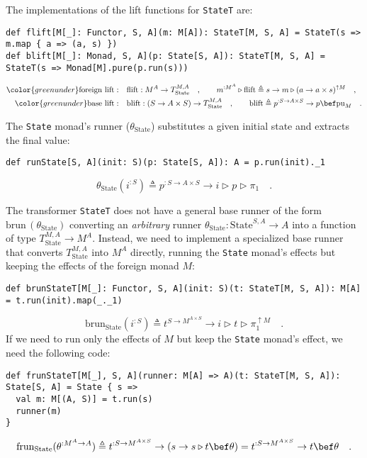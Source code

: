 The implementations of the lift functions for \lstinline!StateT!
are:
\begin{lstlisting}
def flift[M[_]: Functor, S, A](m: M[A]): StateT[M, S, A] = StateT(s => m.map { a => (a, s) })
def blift[M[_]: Monad, S, A](p: State[S, A]): StateT[M, S, A] = StateT(s => Monad[M].pure(p.run(s)))
\end{lstlisting}
\begin{align*}
{\color{greenunder}\text{foreign lift}:}\quad & \text{flift}:M^{A}\rightarrow T_{\text{State}}^{M,A}\quad,\quad\quad m^{:M^{A}}\triangleright\text{flift}\triangleq s\rightarrow m\triangleright(a\rightarrow a\times s)^{\uparrow M}\quad,\\
{\color{greenunder}\text{base lift}:}\quad & \text{blift}:(S\rightarrow A\times S)\rightarrow T_{\text{State}}^{M,A}\quad,\quad\quad\text{blift}\triangleq p^{:S\rightarrow A\times S}\rightarrow p\bef\text{pu}_{M}\quad.
\end{align*}

The \lstinline!State! monad\textsf{'}s runner ($\theta_{\text{State}}$) substitutes
a given initial state and extracts the final value:
\begin{lstlisting}
def runState[S, A](init: S)(p: State[S, A]): A = p.run(init)._1
\end{lstlisting}
\[
\theta_{\text{State}}(i^{:S})\triangleq p^{:S\rightarrow A\times S}\rightarrow i\triangleright p\triangleright\pi_{1}\quad.
\]

The transformer \lstinline!StateT! does not have a general base runner
of the form $\text{brun}\,(\theta_{\text{State}})$ converting an
\emph{arbitrary} runner $\theta_{\text{State}}:\text{State}^{S,A}\rightarrow A$
into a function of type $T_{\text{State}}^{M,A}\rightarrow M^{A}$.
Instead, we need to implement a specialized base runner that converts
$T_{\text{State}}^{M,A}$ into $M^{A}$ directly, running the \lstinline!State!
monad\textsf{'}s effects but keeping the effects of the foreign monad $M$:
\begin{lstlisting}
def brunStateT[M[_]: Functor, S, A](init: S)(t: StateT[M, S, A]): M[A] = t.run(init).map(_._1)
\end{lstlisting}
\[
\text{brun}_{\text{State}}(i^{:S})\triangleq t^{S\rightarrow M^{A\times S}}\rightarrow i\triangleright t\triangleright\pi_{1}^{\uparrow M}\quad.
\]
If we need to run only the effects of $M$ but keep the \lstinline!State!
monad\textsf{'}s effect, we need the following code:
\begin{lstlisting}
def frunStateT[M[_], S, A](runner: M[A] => A)(t: StateT[M, S, A]): State[S, A] = State { s =>
  val m: M[(A, S)] = t.run(s)
  runner(m)
}
\end{lstlisting}
\[
\text{frun}_{\text{State}}(\theta^{:M^{A}\rightarrow A})\triangleq t^{:S\rightarrow M^{A\times S}}\rightarrow\left(s\rightarrow s\triangleright t\bef\theta\right)=t^{:S\rightarrow M^{A\times S}}\rightarrow t\bef\theta\quad.
\]


